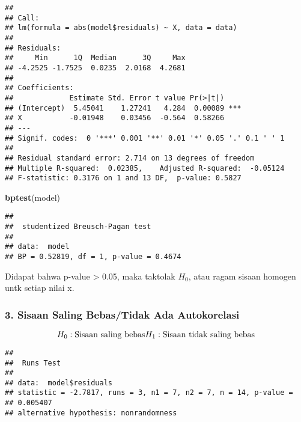 \documentclass[
]{article}
\newenvironment{Shaded}{\begin{snugshade}}{\end{snugshade}}
\newcommand{\FunctionTok}[1]{\textcolor[rgb]{0.13,0.29,0.53}{\textbf{#1}}}
\newcommand{\NormalTok}[1]{#1}
\newcommand{\SpecialCharTok}[1]{\textcolor[rgb]{0.81,0.36,0.00}{\textbf{#1}}}
\begin{document}
\begin{verbatim}
## 
## Call:
## lm(formula = abs(model$residuals) ~ X, data = data)
## 
## Residuals:
##     Min      1Q  Median      3Q     Max 
## -4.2525 -1.7525  0.0235  2.0168  4.2681 
## 
## Coefficients:
##             Estimate Std. Error t value Pr(>|t|)    
## (Intercept)  5.45041    1.27241   4.284  0.00089 ***
## X           -0.01948    0.03456  -0.564  0.58266    
## ---
## Signif. codes:  0 '***' 0.001 '**' 0.01 '*' 0.05 '.' 0.1 ' ' 1
## 
## Residual standard error: 2.714 on 13 degrees of freedom
## Multiple R-squared:  0.02385,    Adjusted R-squared:  -0.05124 
## F-statistic: 0.3176 on 1 and 13 DF,  p-value: 0.5827
\end{verbatim}

\begin{Shaded}
\begin{Highlighting}[]
\FunctionTok{bptest}\NormalTok{(model)}
\end{Highlighting}
\end{Shaded}

\begin{verbatim}
## 
##  studentized Breusch-Pagan test
## 
## data:  model
## BP = 0.52819, df = 1, p-value = 0.4674
\end{verbatim}

Didapat bahwa p-value \textgreater{} 0.05, maka taktolak \(H_0\), atau
ragam sisaan homogen untk setiap nilai x.

\hypertarget{sisaan-saling-bebastidak-ada-autokorelasi}{%
\subsubsection{3. Sisaan Saling Bebas/Tidak Ada
Autokorelasi}\label{sisaan-saling-bebastidak-ada-autokorelasi}}

\[
H_0 : \text{Sisaan saling bebas}\\H_1 : \text{Sisaan tidak saling bebas}
\]

\begin{Shaded}
\end{Shaded}

\begin{verbatim}
## 
##  Runs Test
## 
## data:  model$residuals
## statistic = -2.7817, runs = 3, n1 = 7, n2 = 7, n = 14, p-value =
## 0.005407
## alternative hypothesis: nonrandomness
\end{verbatim}
\end{document}
